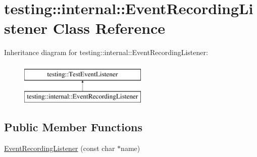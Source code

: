 \hypertarget{classtesting_1_1internal_1_1_event_recording_listener}{\section{testing\-:\-:internal\-:\-:Event\-Recording\-Listener Class Reference}
\label{classtesting_1_1internal_1_1_event_recording_listener}
}
Inheritance diagram for testing\-:\-:internal\-:\-:Event\-Recording\-Listener\-:\begin{figure}[H]
\begin{center}
\leavevmode
\includegraphics[height=2.000000cm]{classtesting_1_1internal_1_1_event_recording_listener}
\end{center}
\end{figure}
\subsection*{Public Member Functions}
\begin{DoxyCompactItemize}
\item 
\hyperlink{classtesting_1_1internal_1_1_event_recording_listener_a7b0254c15d6b8468e1441ee572fee707}{Event\-Recording\-Listener} (const char $\ast$name)
\end{DoxyCompactItemize}

